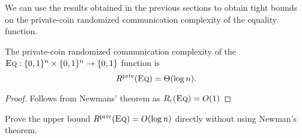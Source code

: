 We can use the results obtained in the previous sections to obtain tight bounds on the private-coin randomized communication complexity of the equality function.

\begin{theorem}
The private-coin randomized communication complexity of the $\textsc{Eq} : \{0,1\}^n \times \{0,1\}^n \to \{0,1\}$ function is
\[
R^{\mathrm{priv}}(\textsc{Eq}) = \Theta( \log n).
\]
\end{theorem}

\begin{proof}
Follows from Newmans' theorem as $R_\epsilon(\textsc{Eq}) = O(1)$
\end{proof}

\exercises

\begin{exercise}
Prove the upper bound $R^{\mathrm{priv}}(\textsc{Eq}) = O( \log n)$ directly without using Newman's theorem.
\end{exercise}



% 